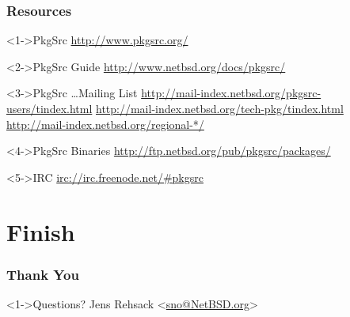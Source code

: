 \documentclass[ngerman,xcolor={table,dvipsnames},smaller,compress,hyperref={bookmarks,colorlinks}]{beamer}
\begin{document}
\begin{frame}[fragile]
\frametitle{Resources}
\begin{block}<1->{PkgSrc}
\url{http://www.pkgsrc.org/}
\end{block}

\begin{block}<2->{PkgSrc Guide}
\url{http://www.netbsd.org/docs/pkgsrc/}
\end{block}

\begin{block}<3->{PkgSrc \ldots Mailing List}
\url{http://mail-index.netbsd.org/pkgsrc-users/tindex.html}
\url{http://mail-index.netbsd.org/tech-pkg/tindex.html}
\url{http://mail-index.netbsd.org/regional-*/}
\end{block}

\begin{block}<4->{PkgSrc Binaries}
\url{http://ftp.netbsd.org/pub/pkgsrc/packages/}
\end{block}

\begin{block}<5->{IRC}
\url{irc://irc.freenode.net/#pkgsrc}
\end{block}
\end{frame}

\section{Finish}

\begin{frame}[fragile]
\frametitle{Thank You}
\begin{block}<1->{Questions?}
Jens Rehsack \textless{}\href{mailto:sno@NetBSD.org}{sno@NetBSD.org}\textgreater{}
\end{block}
\end{frame}

\end{document}
